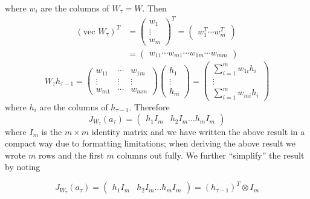 where $w_i$ are the columns of $W_\tau = W$. Then
%
\begin{align*}
  (\mbox{vec } W_\tau)^T & = \begin{pmatrix}w_1 \\ \vdots \\ w_m \end{pmatrix}^T = \begin{pmatrix}w_1^T \cdots w_m^T \end{pmatrix} \\
  & = \begin{pmatrix} w_{11} \cdots w_{m1} \cdots w_{1m} \cdots w_{mm} \end{pmatrix}
\end{align*}
%
\begin{equation*}
  W_\tau h_{\tau - 1} = \begin{pmatrix}
    w_{11} & \cdots & w_{1m} \\
    \vdots & \vdots & \vdots \\
    w_{m1} & \cdots & w_{mm}
  \end{pmatrix} \begin{pmatrix}
    h_1 \\ \vdots \\ h_m
  \end{pmatrix} = \begin{pmatrix}
    \sum_{i=1}^m w_{1i} h_i \\
    \vdots \\
    \sum_{i=1}^m w_{mi} h_i
  \end{pmatrix}
\end{equation*}
%
where $h_i$ are the columns of $h_{\tau - 1}$. Therefore
%
\begin{equation*}
  J_{W_\tau}(a_{\tau}) = \begin{pmatrix}
    h_1 I_m & h_2 I_m \ldots h_m I_m
  \end{pmatrix}
\end{equation*}
%
where $I_m$ is the $m \times m$ identity matrix and we have written the above result in a compact way due to formatting limitations; when deriving the above result we wrote $m$ rows and the first $m$ columns out fully. We further ``simplify'' the result by noting

\begin{equation*}
J_{W_\tau}(a_\tau) = \begin{pmatrix}h_1 I_m & h_2 I_m \ldots h_m I_m \end{pmatrix} = (h_{\tau - 1})^T \otimes I_m
\end{equation*}


